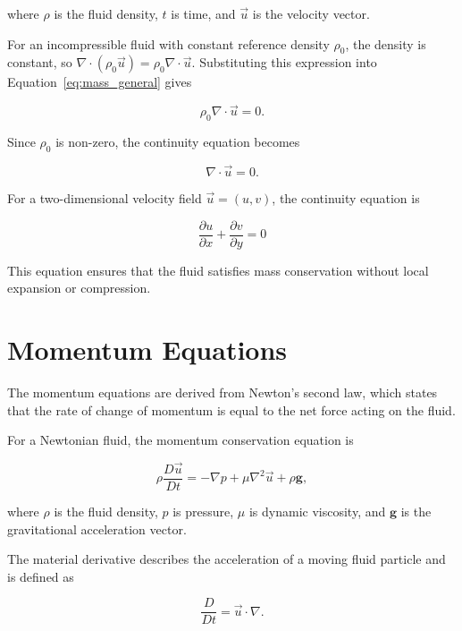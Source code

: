\documentclass[preprint,3p,number]{elsarticle}
\begin{document}
where $\rho$ is the fluid density, $t$ is time, and
$\vec{u}$ is the velocity vector.

For an incompressible fluid with constant reference density
$\rho_0$, the density is constant, so
$\nabla\cdot(\rho_0\vec{u})=\rho_0\nabla\cdot\vec{u}$.
Substituting this expression into
Equation~\eqref{eq:mass_general} gives

\begin{equation}
\rho_0\nabla\cdot\vec{u}=0.
\end{equation}

Since $\rho_0$ is non-zero, the continuity equation becomes

\begin{equation}
\nabla\cdot\vec{u}=0.
\end{equation}

For a two-dimensional velocity field
$\vec{u}=(u,v)$, the continuity equation is

\begin{equation}
\boxed{
\frac{\partial u}{\partial x}
+\frac{\partial v}{\partial y}=0
}
\label{eq:continuity}
\end{equation}

This equation ensures that the fluid satisfies mass
conservation without local expansion or compression.

\section{Momentum Equations}

The momentum equations are derived from Newton's second law,
which states that the rate of change of momentum is equal to
the net force acting on the fluid.

For a Newtonian fluid, the momentum conservation equation is

\begin{equation}
\rho\frac{D\vec{u}}{Dt}
=-\nabla p+\mu\nabla^2\vec{u}
+\rho\mathbf{g},
\label{eq:momentum_general}
\end{equation}

where $\rho$ is the fluid density, $p$ is pressure, $\mu$ is
dynamic viscosity, and $\mathbf{g}$ is the gravitational
acceleration vector.

The material derivative describes the acceleration of a
moving fluid particle and is defined as

\begin{equation}
\frac{D}{Dt}=\vec{u}\cdot\nabla.
\end{equation}
\end{document}
